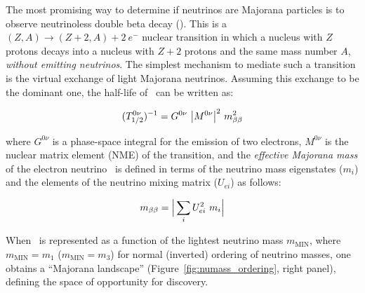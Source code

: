 \indent

The most promising way to determine if neutrinos are Majorana particles is to observe neutrinoless double beta decay (\bbonu). This is a $(Z,A) \rightarrow (Z+2,A) + 2\ e^{-}$ nuclear transition in which a nucleus with $Z$ protons decays into a nucleus with $Z+2$ protons and the same mass number $A$, {\em without emitting neutrinos}. The simplest mechanism to mediate such a transition is the virtual exchange of light Majorana neutrinos. Assuming this exchange to be the  dominant one, the half-life of \bbonu\ can be written as:

\begin{equation}
(T^{0\nu}_{1/2})^{-1} = G^{0\nu} \ \big|M^{0\nu}\big|^{2} \ \mbb^{2}
\label{eq:halflife}
\end{equation}

\noindent where $G^{0\nu}$ is a phase-space integral for the emission of two electrons, $M^{0\nu}$ is the nuclear matrix element (NME) of the transition, and the \emph{effective Majorana mass} of the electron neutrino \mbb\ is defined in terms of the neutrino mass eigenstates ($m_{i}$) and the elements of the neutrino mixing matrix ($U_{ei}$) as follows:

\begin{equation}
m_{\beta\beta} = \Big| \sum_{i} U^{2}_{ei} \ m_{i} \Big|
\label{eq:mbb}
\end{equation}


\indent

When \mbb\ is represented as a function of the lightest neutrino mass $m_\mathrm{MIN}$, where $m_\mathrm{MIN}=m_1$ ($m_\mathrm{MIN}=m_3$) for normal (inverted) ordering of neutrino masses, one obtains a ``Majorana landscape'' (Figure~\ref{fig:numass_ordering}, right panel), defining the space of opportunity for discovery.

\indent

